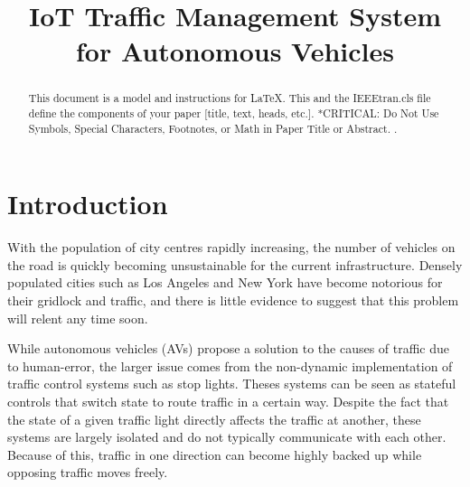 \documentclass[conference]{IEEEtran}
\begin{document}
\title{IoT Traffic Management System for Autonomous Vehicles}

\author{
\and
{}
}

\maketitle

\begin{abstract}
This document is a model and instructions for \LaTeX.
This and the IEEEtran.cls file define the components of your paper [title, text, heads, etc.]. *CRITICAL: Do Not Use Symbols, Special Characters, Footnotes, 
or Math in Paper Title or Abstract. \cite{Chong}\cite{Rizwan}\cite{Avetifipour}\cite{GOTTLICH}\cite{Ghena}.
\end{abstract}

\section{Introduction}

With the population of city centres rapidly increasing, the number of vehicles on the road is quickly becoming unsustainable for the current infrastructure. Densely populated cities such as Los Angeles and New York have become notorious for their gridlock and traffic, and there is little evidence to suggest that this problem will relent any time soon. 

While autonomous vehicles (AVs) propose a solution to the causes of traffic due to human-error, the larger issue comes from the non-dynamic implementation of traffic control systems such as stop lights. Theses systems can be seen as stateful controls that switch state to route traffic in a certain way. Despite the fact that the state of a given traffic light directly affects the traffic at another, these systems are largely isolated and do not typically communicate with each other. Because of this, traffic in one direction can become highly backed up while opposing traffic moves freely. 
\end{document}
